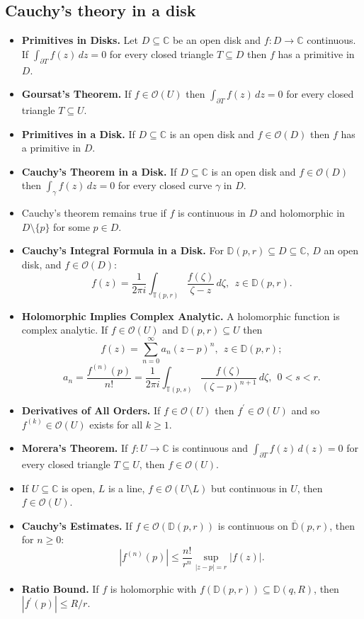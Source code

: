 \documentclass{article}
\newenvironment{topic}[1]{%
{\subsection{#1}}%
\begin{itemize}%
}{%
\end{itemize}%
}
\newcommand{\theorem}[1]{\item {\bf #1.}}
\newcommand{\corollary}[1]{\item {\bf #1.}}
\newcommand{\holo}[1]{\mathcal{O}(#1)}
\newcommand{\remark}{\item}
\newcommand{\disk}[2]{\mathbb{D}(#1, #2)}
\newcommand{\cdisk}[2]{\overline{\mathbb{D}}(#1, #2)}
\newcommand{\sphere}[2]{\mathbb{T}{(#1, #2)}}
\begin{document}
\begin{topic}{Cauchy's theory in a disk}

\theorem{Primitives in Disks} Let $D \subseteq \mathbb{C}$ be an open disk and $f : D \to \mathbb{C}$ continuous. If $\int_{\partial T} f(z)\,dz = 0$ for every closed triangle $T \subseteq D$ then $f$ has a primitive in $D$.

\theorem{Goursat's Theorem} If $f \in \holo{U}$ then $\int_{\partial T} f(z)\,dz = 0$ for every closed triangle $T \subseteq U$.

\theorem{Primitives in a Disk} If $D \subseteq \mathbb{C}$ is an open disk and $f \in \holo{D}$ then $f$ has a primitive in $D$.

\theorem{Cauchy's Theorem in a Disk} If $D \subseteq \mathbb{C}$ is an open disk and $f \in \holo{D}$ then $\int_\gamma f(z)\,dz = 0$ for every closed curve $\gamma$ in $D$.

\remark Cauchy's theorem remains true if $f$ is continuous in $D$ and holomorphic in $D \setminus \{p\}$ for some $p \in D$.

\theorem{Cauchy's Integral Formula in a Disk} For $\disk{p}{r} \subseteq D \subseteq \mathbb{C}$, $D$ an open disk, and $f \in \holo{D}$: $$f(z) = \dfrac{1}{2\pi i}\int_{\sphere{p}{r}} \dfrac{f(\zeta)}{\zeta - z}\, d\zeta,~~z \in \disk{p}{r}.$$

\theorem{Holomorphic Implies Complex Analytic} A holomorphic function is complex analytic. If $f \in \holo{U}$ and $\disk{p}{r} \subseteq U$ then $$f(z) = \sum_{n=0}^\infty a_n (z - p)^n,~~z \in \disk{p}{r};$$ $$a_n = \dfrac{f^{(n)}(p)}{n!} = \dfrac{1}{2\pi i}\int_{\sphere{p}{s}} \dfrac{f(\zeta)}{(\zeta - p)^{n+1}}\,d\zeta,~~0 < s < r.$$

\corollary{Derivatives of All Orders} If $f \in \holo{U}$ then $f^\prime \in \holo{U}$ and so $f^{(k)} \in \holo{U}$ exists for all $k \geq 1$.

\theorem{Morera's Theorem} If $f : U \to \mathbb{C}$ is continuous and $\int_{\partial T} f(z)\,d(z) = 0$ for every closed triangle $T \subseteq U$, then $f \in \holo{U}$.

\remark If $U \subseteq \mathbb{C}$ is open, $L$ is a line, $f \in \holo{U \setminus L}$ but continuous in $U$, then $f \in \holo{U}$.

\theorem{Cauchy's Estimates} If $f \in \holo{\disk{p}{r}}$ is continuous on $\cdisk{p}{r}$, then for $n \geq 0$: $$\left|f^{(n)}(p)\right| \leq \dfrac{n!}{r^n} \sup_{|z - p| = r} |f(z)|.$$

\theorem{Ratio Bound} If $f$ is holomorphic with $f(\disk{p}{r}) \subseteq \disk{q}{R}$, then $|f^\prime(p)| \leq R/r$.


\end{topic}
\end{document}
